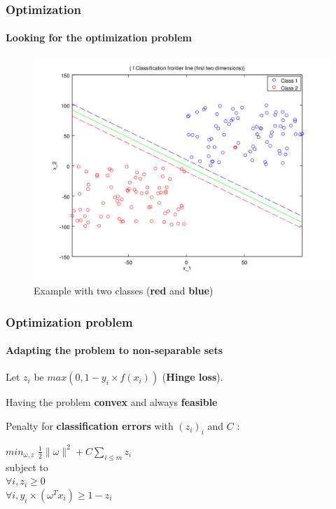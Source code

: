\documentclass{beamer}
\begin{document}
\begin{frame}
\frametitle{Optimization}
\framesubtitle{Looking for the optimization problem}

         \begin{figure}
         \centering
         \caption{Example with two classes (\textbf{red} and \textbf{blue})}
         \includegraphics[scale=0.4]{images/voronoi2.png}
         \end{figure}

\end{frame}

\begin{frame}
\frametitle{Optimization problem}
\framesubtitle{Adapting the problem to \textbf{non-separable sets}}

Let $z_i$ be $max(0, 1-y_i \times f(x_i))$ (\textbf{Hinge loss}).

\pause

\bigskip

\begin{block}{Having the problem \textbf{convex} and always \textbf{feasible}}

Penalty for \textbf{classification errors} with $(z_i)_i$ and $C$ :

           \begin{center}
           $min_{\omega, z}$ $\frac{1}{2} \|\omega\|^2 + C \sum_{i \leq m}z_i$\\
           subject to\\ $\forall i, z_i \geq 0$\\
           $\forall i, y_i \times (\omega^{T} x_i) \geq 1 - z_i$\\
           \end{center}

\end{block}

\end{frame}
\end{document}
